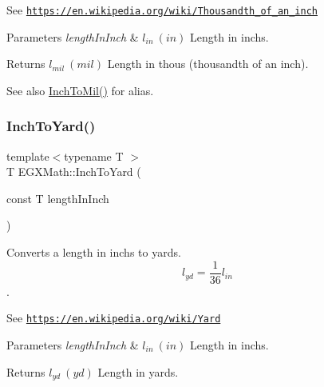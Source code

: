 See \href{https://en.wikipedia.org/wiki/Thousandth_of_an_inch}{\tt https\+://en.\+wikipedia.\+org/wiki/\+Thousandth\+\_\+of\+\_\+an\+\_\+inch} 
\begin{DoxyParams}{Parameters}
{\em length\+In\+Inch} & $ l_{in}\ (in)$ Length in inchs. \\
\hline
\end{DoxyParams}
\begin{DoxyReturn}{Returns}
$ l_{mil}\ (mil)$ Length in thous (thousandth of an inch). 
\end{DoxyReturn}
\begin{DoxySeeAlso}{See also}
\mbox{\hyperlink{group___e_g_x_math-_conversions-_length_conversions-_imperial-_inch-_imperial_ga87110f96478b747855d7c022ad06818b}{Inch\+To\+Mil()}} for alias. 
\end{DoxySeeAlso}
\mbox{\label{group___e_g_x_math-_conversions-_length_conversions-_imperial-_inch-_imperial_gab2785bf628009109ea63c917397834fb}} 
\subsubsection{\texorpdfstring{Inch\+To\+Yard()}{InchToYard()}}
{\footnotesize\ttfamily template$<$typename T $>$ \\
T E\+G\+X\+Math\+::\+Inch\+To\+Yard (\begin{DoxyParamCaption}\item[{const T}]{length\+In\+Inch }\end{DoxyParamCaption})}



Converts a length in inchs to yards. \[ l_{yd}= \frac{1}{36} l_{in} \]. 

See \href{https://en.wikipedia.org/wiki/Yard}{\tt https\+://en.\+wikipedia.\+org/wiki/\+Yard} 
\begin{DoxyParams}{Parameters}
{\em length\+In\+Inch} & $ l_{in}\ (in)$ Length in inchs. \\
\hline
\end{DoxyParams}
\begin{DoxyReturn}{Returns}
$ l_{yd}\ (yd)$ Length in yards. 
\end{DoxyReturn}

